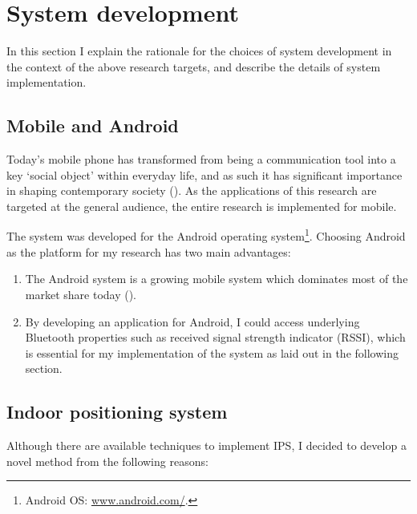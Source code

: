 \documentclass[a4paper,11pt]{article}
\begin{document}
\section{System development}

In this section I explain the rationale for the choices of system development in the context of the above research targets, and describe the details of system implementation.

\subsection{Mobile and Android}

Today's mobile phone has transformed from being a communication tool into a key `social object' within everyday life, and as such it has significant importance in shaping contemporary society (\cite{srivastava05}).
As the applications of this research are targeted at the general audience, the entire research is implemented for mobile.

The system was developed for the Android operating system\footnote{Android OS: \href{http://www.android.com/}{www.android.com/}.}.
Choosing Android as the platform for my research has two main advantages:
\begin{enumerate}
	\item The Android system is a growing mobile system which dominates most of the market share today (\cite{web:idc}).
	\item By developing an application for Android, I could access underlying Bluetooth properties such as received signal strength indicator (RSSI), which is essential for my implementation of the system as laid out in the following section.
\end{enumerate}

\subsection{Indoor positioning system}\label{methods:ips}

Although there are available techniques to implement IPS, I decided to develop a novel method from the following reasons:
\end{document}
